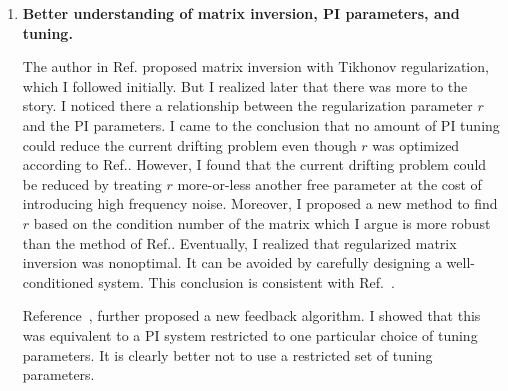 \begin{enumerate}

\item {\bf Better understanding of matrix inversion, PI parameters, and tuning.} 

The author in Ref.\cite{bea} proposed matrix inversion with Tikhonov regularization, which I followed initially. But I realized later that there was more to the story. I noticed there a relationship between the regularization parameter $r$ and the PI parameters. I came to the conclusion that no amount of PI tuning could reduce the current drifting problem even though $r$ was optimized according to Ref.\cite{bea}.  However, I found that the current drifting problem could be reduced by treating $r$ more-or-less another free parameter at the cost of introducing high frequency noise. Moreover, I proposed a new method to find $r$ based on the condition number of the matrix which I argue is more robust than the method of Ref.\cite{bea}. Eventually, I realized that regularized matrix inversion was nonoptimal. It can be avoided by carefully designing a well-conditioned system. This conclusion is consistent with Ref.~\cite{rawlikpriv}. 

Reference~\cite{rawlik,rawlikpriv}, further proposed a new feedback algorithm. I showed that this was equivalent to a PI system restricted to one particular choice of tuning parameters. It is clearly better not to use a restricted set of tuning parameters.




\end{enumerate}
